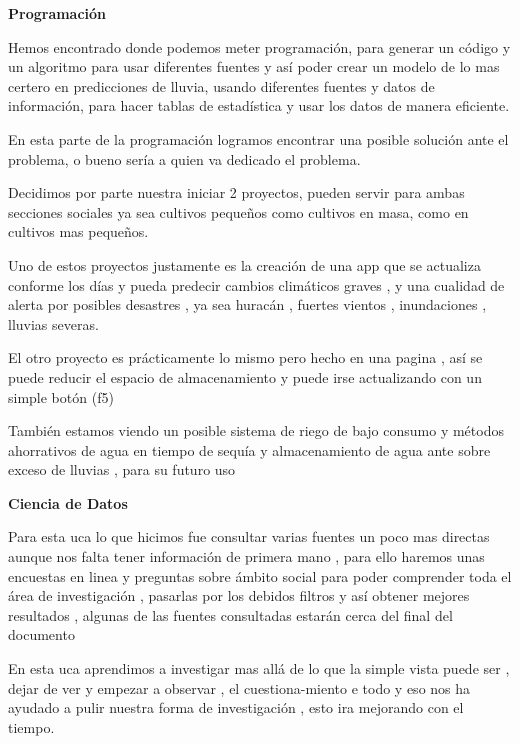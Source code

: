\documentclass[12pt]{article}
\begin{document}
{{{	\newpage
	\begin{center}
		{\huge \textbf{Programación}}
	\end{center}
	\vspace{1cm} 
	{\large %
		Hemos encontrado donde podemos meter programación, para generar un código y un algoritmo para usar diferentes fuentes y así poder crear un modelo de lo mas certero en predicciones de lluvia, usando diferentes fuentes y datos de información, para hacer tablas de estadística y usar los datos de manera eficiente.
		
		En esta parte de la programación logramos encontrar una posible solución ante el problema, o bueno sería a quien va dedicado el problema.
		
		Decidimos por parte nuestra iniciar 2 proyectos, pueden servir para ambas secciones sociales ya sea cultivos pequeños como cultivos en masa, como en cultivos mas pequeños.
		
		Uno de estos proyectos justamente es la creación de una app que se actualiza conforme los días y pueda predecir cambios climáticos graves , y una cualidad de alerta por posibles desastres , ya sea huracán , fuertes vientos , inundaciones , lluvias severas.
		
		El otro proyecto es prácticamente lo mismo pero hecho en una pagina , así se puede reducir el espacio de almacenamiento y puede irse actualizando con un simple botón (f5)\
		
		También estamos viendo un posible sistema de riego de bajo consumo y métodos ahorrativos de agua en tiempo de sequía y almacenamiento de agua ante  sobre exceso de lluvias , para su futuro uso 
		\newpage
		\begin{center}
			{\huge \textbf{Ciencia de Datos}}
		\end{center}
		\vspace{1cm} 
		{\large %
		Para esta uca lo que hicimos fue consultar varias fuentes un poco mas directas aunque nos falta tener información de primera mano , para ello haremos unas encuestas en linea y preguntas sobre ámbito social para poder comprender toda el área de investigación , pasarlas por los debidos filtros y así obtener mejores resultados , algunas de las fuentes consultadas estarán cerca del final del documento
		
		En esta uca aprendimos a investigar mas allá de lo que la simple vista puede ser , dejar de ver y empezar a observar , el cuestiona-miento e todo y eso nos ha ayudado a pulir nuestra forma de investigación , esto ira mejorando con el tiempo.
		
}}}}}
\end{document}

